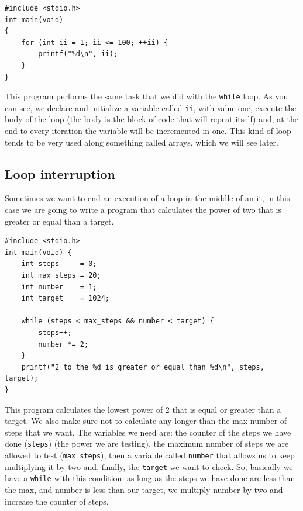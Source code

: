 \documentclass[a4paper]{article}
\begin{document}
\noindent
\begin{minipage}[H]{\linewidth}
\mbox{}
\begin{lstlisting}[style=C,
caption={Example of a program with a \texttt{for} loop},
label={lst:forStructure}]
#include <stdio.h>
int main(void)
{
    for (int ii = 1; ii <= 100; ++ii) {
        printf("%d\n", ii);
    }
}
\end{lstlisting}
\end{minipage}

This program performs the same task that we did with the \texttt{while} loop.
As you can see, we declare and initialize a variable called \texttt{ii}, with
value one, execute the body of the loop (the body is the block of code that
will repeat itself) and, at the end to every iteration the variable will be
incremented in one. This kind of loop tends to be very used along something
called arrays, which we will see later.

\subsection{Loop interruption}
Sometimes we want to end an execution of a loop in the middle of an it,
in this case we are going to write a program that calculates the power of two
that is greater or equal than a target.

\noindent
\begin{minipage}[H]{\linewidth}
\mbox{}
\begin{lstlisting}[style=C,
caption={Example of interruption of a loop with an auxiliary variable},
label={lst:loopInterruption}]
#include <stdio.h>
int main(void) {
    int steps     = 0;
    int max_steps = 20;
    int number    = 1;
    int target    = 1024;

    while (steps < max_steps && number < target) {
        steps++;
        number *= 2;
    }
    printf("2 to the %d is greater or equal than %d\n", steps, target);
}
\end{lstlisting}
\end{minipage}

This program calculates the lowest power of 2 that is equal or greater than a
target. We also make sure not to calculate any longer than the max number of
steps that we want.
The variables we need are: the counter of the steps we have done
(\texttt{steps}) (the power we
are testing), the maximum number of steps we are allowed to test
(\texttt{max\_steps}), then a
variable called \texttt{number} that allows us to keep multiplying it by two
and, finally, the \texttt{target} we want to check.
So, basically we have a \texttt{while} with this condition:
as long as the steps we have done are less than the max, and number is less than
our target, we multiply number by two and increase the counter of steps.
\end{document}
